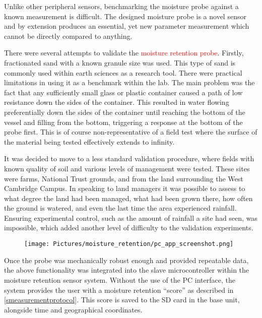 Unlike other peripheral sensors, benchmarking the moisture probe against a known measurement is difficult. The designed moisture probe is a novel sensor and by extension produces an essential, yet new parameter measurement which cannot be directly compared to anything.

There were several attempts to validate the \textcolor{red}{moisture retention probe}. Firstly, fractionated sand with a known granule size was used. This type of sand is commonly used within earth sciences as a research tool. There were practical limitations in using it as a benchmark within the lab. The main problem was the fact that any sufficiently small glass or plastic container caused a path of low resistance down the sides of the container. This resulted in water flowing preferentially down the sides of the container until reaching the bottom of the vessel and filling from the bottom, triggering a response at the bottom of the probe first. This is of course non-representative of a field test where the surface of the material being tested effectively extends to infinity.

It was decided to move to a less standard validation procedure, where fields with known quality of soil and various levels of management were tested. These sites were farms, National Trust grounds, and from the land surrounding the West Cambridge Campus. In speaking to land managers it was possible to assess to what degree the land had been managed, what had been grown there, how often the ground is watered, and even the last time the area experienced rainfall. Ensuring experimental control, such as the amount of rainfall a site had seen, was impossible, which added another level of difficulty to the validation experiments.

\begin{figure}
	\centerline{\texttt{[image: Pictures/moisture\_retention/pc\_app\_screenshot.png]}}
	\captionsetup{justification = centering}
	\label{fmrpcscreenshot}
\end{figure}

Once the probe was mechanically robust enough and provided repeatable data, the above functionality was integrated into the slave microcontroller within the moisture retention sensor system. Without the use of the PC interface, the system provides the user with a moisture retention \enquote{score} as described in \cref{smeasurementprotocol}.
This score is saved to the SD card in the base unit, alongside time and geographical coordinates.


